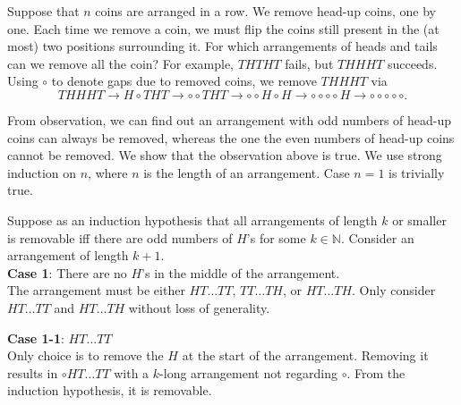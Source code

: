 \documentclass[../main.tex]{subfiles}
\begin{document}
\begin{prob}
    Suppose that $n$ coins are arranged in a row.
    We remove head-up coins, one by one.
    Each time we remove a coin, we must flip the coins still present in the (at most) two positions surrounding it.
    For which arrangements of heads and tails can we remove all the coin?
    For example, $THTHT$ fails, but $THHHT$ succeeds.
    Using $\circ$ to denote gaps due to removed coins, we remove $THHHT$ via
    \[
        THHHT \rightarrow H \circ THT \rightarrow \circ \circ THT \rightarrow \circ \circ H \circ H \rightarrow \circ \circ \circ \circ H \rightarrow \circ \circ \circ \circ \circ.
    \]
\end{prob}
\begin{sol}
    From observation, we can find out an arrangement with odd numbers of head-up coins can always be removed, whereas the one the even numbers of head-up coins cannot be removed.
    We show that the observation above is true.
    We use strong induction on $n$, where $n$ is the length of an arrangement.
    Case $n=1$ is trivially true.

    Suppose as an induction hypothesis that all arrangements of length $k$ or smaller is removable iff there are odd numbers of $H$'s for some $k \in \mathbb N$.
    Consider an arrangement of length $k + 1$.\\
    \noindent \textbf{Case 1}: There are no $H$'s in the middle of the arrangement.\\
    \indent The arrangement must be either $HT\dots TT$, $TT\dots TH$, or $HT \dots TH$.
    Only consider $HT\dots TT$ and $HT \dots TH$ without loss of generality.

    \noindent \textbf{Case 1-1}: $HT\dots TT$\\
    \indent Only choice is to remove the $H$ at the start of the arrangement.
    Removing it results in $\circ HT\dots TT$ with a $k$-long arrangement not regarding $\circ$.
    From the induction hypothesis, it is removable.


\end{sol}
\end{document}
